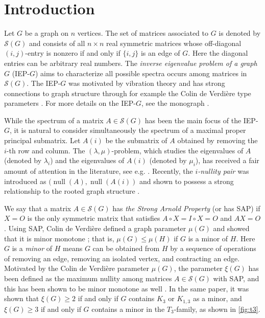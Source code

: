 \documentclass{article}
\theoremstyle{definition}
\newcommand{\nul}{\operatorname{null}}
\newcommand{\mptn}{\mathcal{S}} %
\begin{document}
\section{Introduction}
\label{sec:intro}
Let $G$ be a graph on $n$ vertices.  The set of matrices associated to $G$ is denoted by $\mptn(G)$ and consists of all $n\times n$ real symmetric matrices whose off-diagonal $(i,j)$-entry is nonzero if and only if $\{i,j\}$ is an edge of $G$.  Here the diagonal entries can be arbitrary real numbers.
The \emph{inverse eigenvalue problem of a graph $G$} (IEP-$G$) aims to characterize all possible spectra occurs among matrices in $\mptn(G)$.  The IEP-$G$ was motivated by vibration theory \cite{Hochstadt74, GW76, Hald76, Ferguson80, BG87, MS13, GladwellIPiV05} and has strong connections to graph structure through for example the Colin de Verdi\`ere type parameters \cite{CdV, CdVF, BFH05, IEPG2}.
For more details on the IEP-$G$, see the monograph \cite{IEPGZF22}.

While the spectrum of a matrix $A\in\mptn(G)$ has been the main focus of the IEP-$G$, it is natural to consider simultaneously the spectrum of a maximal proper principal submatrix.  Let $A(i)$ be the submatrix of $A$ obtained by removing the $i$-th row and column.  The $(\lambda,\mu)$-problem, which studies the eigenvalues of $A$ (denoted by $\lambda_i$) and the eigenvalues of $A(i)$ (denoted by $\mu_i$), has received a fair amount of attention in the literature, see e.g. \cite{Hochstadt74, GW76, Hald76, Ferguson80, BG87, MS13, GladwellIPiV05, lambmu2013, BNSY14}.  Recently, the \emph{$i$-nullity pair} was introduced as $(\nul(A), \nul(A(i))$ and shown to possess a strong relationship to the rooted graph structure \cite{SNIP}.  

We say that a matrix $A\in\mptn(G)$ has \emph{the Strong Arnold Property} (or has SAP) if $X = O$ is the only symmetric matrix that satisfies $A\circ X = I\circ X = O$ and $AX = O$.  Using SAP, Colin de Verdi\`ere defined a graph parameter $\mu(G)$ and showed that it is minor monotone \cite{CdV, CdVF}; that is, $\mu(G) \leq \mu(H)$ if $G$ is a minor of $H$.  Here $G$ is a \emph{minor} of $H$ means $G$ can be obtained from $H$ by a sequence of operations of removing an edge, removing an isolated vertex, and contracting an edge.  Motivated by the Colin de Verdi\`ere parameter $\mu(G)$, the parameter $\xi(G)$ has been defined as the maximum nullity among matrices $A\in\mptn(G)$ with SAP, and this has been shown to be minor monotone as well \cite{BFH05}.  In the same paper, it was shown that $\xi(G) \geq 2$ if and only if $G$ contains $K_3$ or $K_{1,3}$ as a minor, and $\xi(G) \geq 3$ if and only if $G$ contains a minor in the $T_3$-family, as shown in \cref{fig:t3}.
\end{document}
